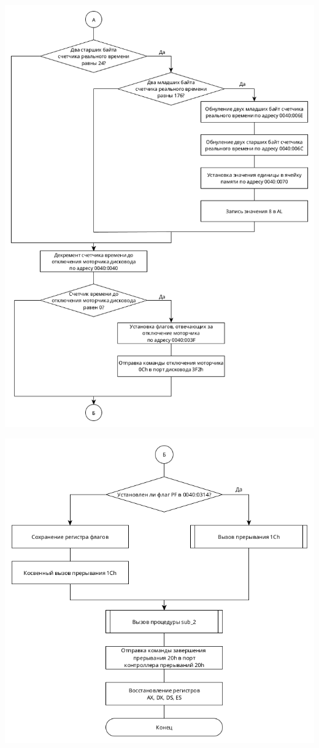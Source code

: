 \documentclass[14pt, a4paper]{article}
\begin{document}
	\begin{minipage}{0.9\linewidth}
		\includegraphics[width=\linewidth]{diagram1_2}
	\end{minipage}

	\pagebreak
	
	\begin{minipage}{0.9\linewidth}
		\includegraphics[width=\linewidth]{diagram1_3}
	\end{minipage}
\end{document}
